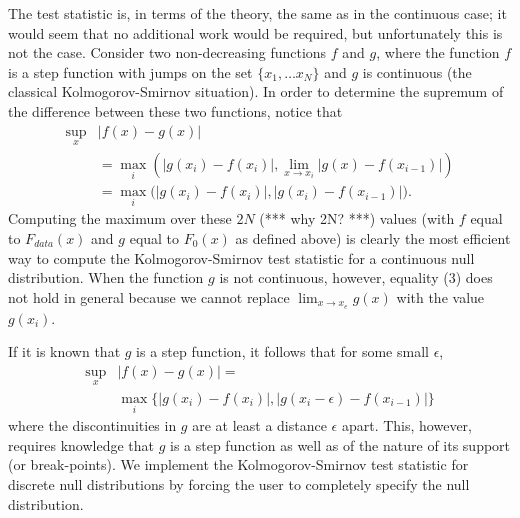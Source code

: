 The test statistic is, in terms of the theory, the same as in the
continuous case; it would seem that no additional work would be required,
but unfortunately this is not the case.
Consider two non-decreasing functions $f$ and $g$, where the function $f$ is a step function with jumps on the set $\{x_1, \ldots x_N \}$ and $g$
is continuous (the classical Kolmogorov-Smirnov situation).
In order to determine the supremum of the difference between
these two functions, notice that
\begin{align}
\sup_x &\left| f(x)- g(x) \right|  \nonumber  \\
       &= \max_i \left( \left|g(x_i) - f(x_i) \right|, \lim_{x \rightarrow x_i} \left| g(x) - f(x_{i-1}) \right| \right) \\
&=  \max_i \bigg( \left|g(x_i) - f(x_i) \right|, \left| g(x_i) - f(x_{i-1}) \right| \bigg).
\end{align}
Computing the maximum over these $2N$ (*** why 2N? ***)
values (with $f$ equal to
$F_{data}(x)$ and $g$ equal to $F_0(x)$ as defined above) is clearly the 
most efficient way to compute the Kolmogorov-Smirnov test statistic for
a continuous null distribution. When the function $g$ is not
continuous, however, equality (3) does not hold in general because 
we cannot replace $\lim_{x\rightarrow x_e} g(x)$ with the value $g(x_i)$. 

If it is known that $g$ is a step function, it follows that
for some small $\epsilon$,
\begin{align}
\sup_x &\left| f(x)- g(x) \right| =  \nonumber \\
        &                    \max_i \{ \left|g(x_i) - f(x_i) \right|, \left| g(x_i - \epsilon) - f(x_{i-1}) \right| \}
\end{align}
where the discontinuities in $g$ are at least a distance $\epsilon$ apart. 
This, however, requires knowledge that $g$ is a step function as well as of
the nature of its support (or break-points).
%
%
We implement the Kolmogorov-Smirnov test statistic for discrete null
distributions by forcing the user to completely specify the null distribution.



